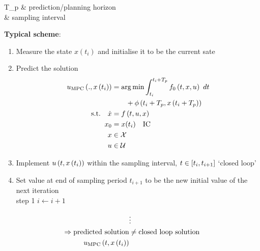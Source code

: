 \begin{variables}
    T_p    & prediction/planning horizon\\
    \delta    & sampling interval
\end{variables}

\textbf{Typical scheme}:
\begin{enumerate}
    \item Measure the state $x(t_i)$
            and initialise it to be the current sate
    \item Predict the solution
            \begin{align*}
                \tund{u}{MPC}\paren{.,x\paren{t_i}}%
                &= \argmin \intdt{t_i}{t_i + T_p}{f_0 \paren{t,x,u}}\\
                &\qquad + \phi \paren{t_i + T_p, x\paren{t_i + T_p}}\\
                \txt{s.t.} \quad
                \dot{x} &= f \paren{t,u,x}\\
                x_0 &= x(t_i) \quad    \txt{IC}\\
                x &\in \setX{}\\
                u &\in \setU{}
            \end{align*}%
    \item Implement $u\left( t,x\left( t_i \right) \right)$ within the sampling interval, $t \in \left[ t_i, t_{i+1} \right]$
        \lat{} `closed loop'
    \item Set value at end of sampling period $t_{i+1}$
    to be the new initial value of the next iteration\\
    \lat{} step 1 $i \leftarrow i + 1$
\end{enumerate}

\begin{figure}[H]
    \def\svgwidth{0.9\columnwidth}
    {\scriptsize }
\end{figure}

\begin{figure}[H]
    \def\svgwidth{\columnwidth}
    {\scriptsize }
%
\begin{align*}
    &\vdots\\
    \Rightarrow \textnormal{predicted solution} &\neq \textnormal{closed loop solution}\\
    {u}_{\textnormal{MPC}}\left( t, x\left( t_i \right) \right) &
\end{align*}
\end{figure}%

